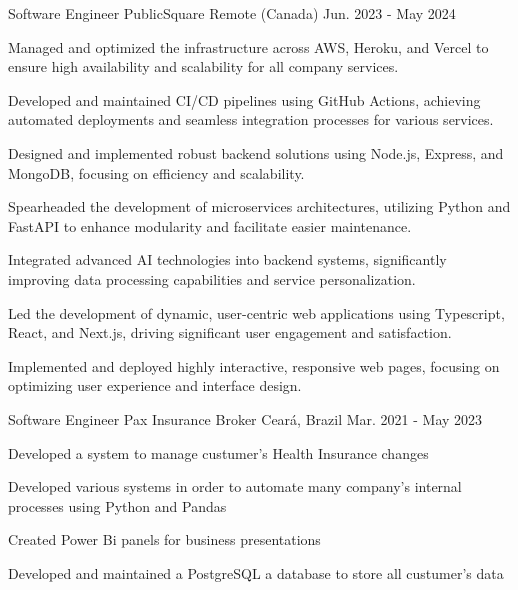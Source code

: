 \begin{cventries}
\cventry
{Software Engineer} %
{PublicSquare} %
{Remote (Canada)} %
{Jun. 2023 - May 2024} %
{
  \begin{cvitems} %
    \item {Managed and optimized the infrastructure across AWS, Heroku, and Vercel to ensure high availability and scalability for all company services.}
    \item{Developed and maintained CI/CD pipelines using GitHub Actions, achieving automated deployments and seamless integration processes for various services.}
    \item{Designed and implemented robust backend solutions using Node.js, Express, and MongoDB, focusing on efficiency and scalability.}
    \item{Spearheaded the development of microservices architectures, utilizing Python and FastAPI to enhance modularity and facilitate easier maintenance.}
    \item{Integrated advanced AI technologies into backend systems, significantly improving data processing capabilities and service personalization.}
    \item{Led the development of dynamic, user-centric web applications using Typescript, React, and Next.js, driving significant user engagement and satisfaction.}
    \item{Implemented and deployed highly interactive, responsive web pages, focusing on optimizing user experience and interface design.}
  \end{cvitems}
}



  \cventry
    {Software Engineer} %
    {Pax Insurance Broker} %
    {Ceará, Brazil} %
    {Mar. 2021 - May 2023} %
    {
      \begin{cvitems} %
        \item {Developed a system to manage custumer's Health Insurance changes}
        \item {Developed various systems in order to automate many company's internal processes using Python and Pandas}
        \item {Created Power Bi panels for business presentations}
        \item {Developed and maintained a PostgreSQL a database to store
        all custumer's data}
      \end{cvitems}
    }


\end{cventries}
